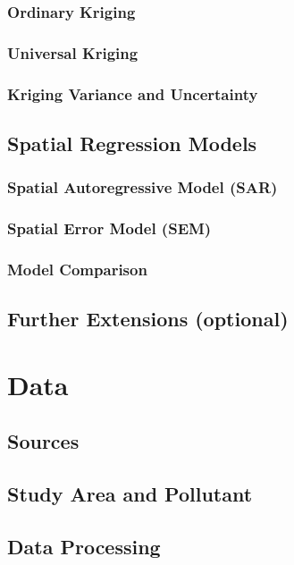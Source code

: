\documentclass[12pt, a4paper]{report}
\begin{document}
\subsection{Ordinary Kriging}
\subsection{Universal Kriging}
\subsection{Kriging Variance and Uncertainty}

\section{Spatial Regression Models}
\subsection{Spatial Autoregressive Model (SAR)}
\subsection{Spatial Error Model (SEM)}
\subsection{Model Comparison}

\section{Further Extensions (optional)}

\chapter{Data}

\section{Sources}

\section{Study Area and Pollutant}

\section{Data Processing}
\end{document}
